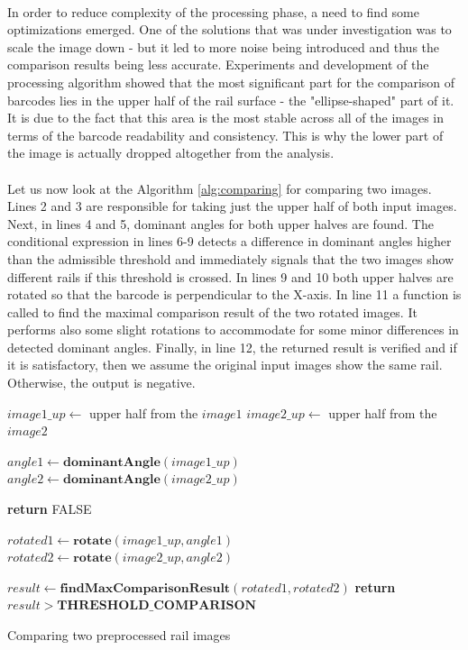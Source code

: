 \paragraph{}
In order to reduce complexity of the processing phase, a need to find some optimizations emerged. One of the solutions that was under investigation was to scale the image down - but it led to more noise being introduced and thus the comparison results being less accurate. Experiments and development of the processing algorithm showed that the most significant part for the comparison of barcodes lies in the upper half of the rail surface - the "ellipse-shaped" part of it. It is due to the fact that this area is the most stable across all of the images in terms of the barcode readability and consistency. This is why the lower part of the image is actually dropped altogether from the analysis.

\paragraph{}
Let us now look at the Algorithm \ref{alg:comparing} for comparing two images. Lines 2 and 3 are responsible for taking just the upper half of both input images. Next, in lines 4 and 5, dominant angles for both upper halves are found. The conditional expression in lines 6-9 detects a difference in dominant angles higher than the admissible threshold and immediately signals that the two images show different rails if this threshold is crossed. In lines 9 and 10 both upper halves are rotated so that the barcode is perpendicular to the X-axis. In line 11 a function is called to find the maximal comparison result of the two rotated images. It performs also some slight rotations to accommodate for some minor differences in detected dominant angles. Finally, in line 12, the returned result is verified and if it is satisfactory, then we assume the original input images show the same rail. Otherwise, the output is negative. 

\begin{algorithm}
	\begin{spacing}{1.5}
	\begin{algorithmic}[1]
			\State $image1\_up \gets$ upper half from the $image1$
			\State $image2\_up \gets$ upper half from the $image2$
			
			\State $angle1 \gets \textbf{dominantAngle}(image1\_up)$
			\State $angle2 \gets \textbf{dominantAngle}(image2\_up)$
			
				\State \textbf{return} FALSE
			\EndIf
			
			\State $rotated1 \gets \textbf{rotate}(image1\_up, angle1)$
			\State $rotated2 \gets \textbf{rotate}(image2\_up, angle2)$
			
			\State $result \gets \textbf{findMaxComparisonResult}(rotated1, rotated2)$
			\State \textbf{return} $result > \textbf{THRESHOLD\_COMPARISON}$
		\EndFunction
	\end{algorithmic}
	\end{spacing}
	\caption{Comparing two preprocessed rail images}
	\label{alg:comparing}
\end{algorithm}

